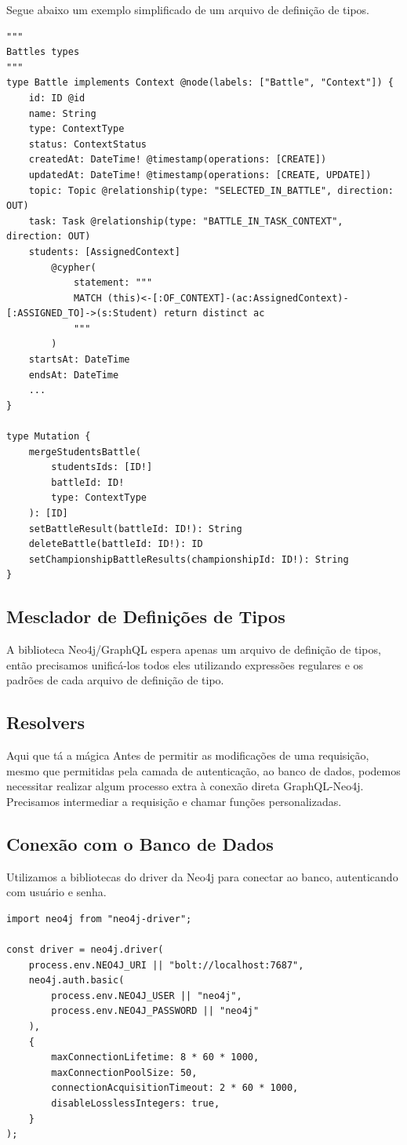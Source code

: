 Segue abaixo um exemplo simplificado de um arquivo de definição de tipos.
\begin{lstlisting}
"""
Battles types
"""
type Battle implements Context @node(labels: ["Battle", "Context"]) {
	id: ID @id
	name: String
	type: ContextType
	status: ContextStatus
	createdAt: DateTime! @timestamp(operations: [CREATE])
	updatedAt: DateTime! @timestamp(operations: [CREATE, UPDATE])
	topic: Topic @relationship(type: "SELECTED_IN_BATTLE", direction: OUT)
	task: Task @relationship(type: "BATTLE_IN_TASK_CONTEXT", direction: OUT)
	students: [AssignedContext]
		@cypher(
			statement: """
			MATCH (this)<-[:OF_CONTEXT]-(ac:AssignedContext)-[:ASSIGNED_TO]->(s:Student) return distinct ac
			"""
		)
	startsAt: DateTime
	endsAt: DateTime
    ...
}

type Mutation {
	mergeStudentsBattle(
		studentsIds: [ID!]
		battleId: ID!
		type: ContextType
	): [ID]
	setBattleResult(battleId: ID!): String
	deleteBattle(battleId: ID!): ID
	setChampionshipBattleResults(championshipId: ID!): String
}
\end{lstlisting}

\subsection{Mesclador de Definições de Tipos}
A biblioteca Neo4j/GraphQL espera apenas um arquivo de definição de tipos, então precisamos unificá-los todos eles utilizando expressões regulares e os padrões de cada arquivo de definição de tipo.

\subsection{Resolvers}

Aqui que tá a mágica 
Antes de permitir as modificações de uma requisição, mesmo que permitidas pela camada de autenticação, ao banco de dados, podemos necessitar realizar algum processo extra à conexão direta GraphQL-Neo4j. Precisamos intermediar a requisição e chamar funções personalizadas. 

\subsection{Conexão com o Banco de Dados}

Utilizamos a bibliotecas do driver da Neo4j para conectar ao banco, autenticando com usuário e senha.

\begin{lstlisting}
import neo4j from "neo4j-driver";

const driver = neo4j.driver(
	process.env.NEO4J_URI || "bolt://localhost:7687",
	neo4j.auth.basic(
		process.env.NEO4J_USER || "neo4j",
		process.env.NEO4J_PASSWORD || "neo4j"
	),
	{
		maxConnectionLifetime: 8 * 60 * 1000,
		maxConnectionPoolSize: 50,
		connectionAcquisitionTimeout: 2 * 60 * 1000,
		disableLosslessIntegers: true,
	}
);
\end{lstlisting}

